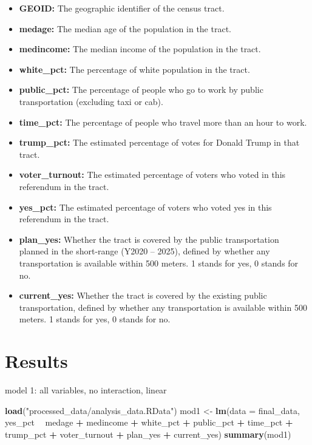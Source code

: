 \documentclass[
]{article}
\newenvironment{Shaded}{\begin{snugshade}}{\end{snugshade}}
\newcommand{\DataTypeTok}[1]{\textcolor[rgb]{0.13,0.29,0.53}{#1}}
\newcommand{\KeywordTok}[1]{\textcolor[rgb]{0.13,0.29,0.53}{\textbf{#1}}}
\newcommand{\NormalTok}[1]{#1}
\newcommand{\OperatorTok}[1]{\textcolor[rgb]{0.81,0.36,0.00}{\textbf{#1}}}
\newcommand{\StringTok}[1]{\textcolor[rgb]{0.31,0.60,0.02}{#1}}
\providecommand{\tightlist}{%
  \setlength{\itemsep}{0pt}\setlength{\parskip}{0pt}}
\begin{document}
\begin{itemize}
\tightlist
\item
  \textbf{GEOID:} The geographic identifier of the census tract.\\
\item
  \textbf{medage:} The median age of the population in the tract.
\item
  \textbf{medincome:} The median income of the population in the tract.
\item
  \textbf{white\_pct:} The percentage of white population in the tract.
\item
  \textbf{public\_pct:} The percentage of people who go to work by
  public transportation (excluding taxi or cab).\\
\item
  \textbf{time\_pct:} The percentage of people who travel more than an
  hour to work.\\
\item
  \textbf{trump\_pct:} The estimated percentage of votes for Donald
  Trump in that tract.
\item
  \textbf{voter\_turnout:} The estimated percentage of voters who voted
  in this referendum in the tract.
\item
  \textbf{yes\_pct:} The estimated percentage of voters who voted yes in
  this referendum in the tract.
\item
  \textbf{plan\_yes:} Whether the tract is covered by the public
  transportation planned in the short-range (Y2020 -- 2025), defined by
  whether any transportation is available within 500 meters. 1 stands
  for yes, 0 stands for no.\\
\item
  \textbf{current\_yes:} Whether the tract is covered by the existing
  public transportation, defined by whether any transportation is
  available within 500 meters. 1 stands for yes, 0 stands for no.
\end{itemize}

\hypertarget{results}{%
\section{Results}\label{results}}

model 1: all variables, no interaction, linear

\begin{Shaded}
\begin{Highlighting}[]
\KeywordTok{load}\NormalTok{(}\StringTok{"processed_data/analysis_data.RData"}\NormalTok{)}
\NormalTok{mod1 <-}\StringTok{ }\KeywordTok{lm}\NormalTok{(}\DataTypeTok{data =}\NormalTok{ final_data, yes_pct }\OperatorTok{~}\StringTok{ }\NormalTok{medage }\OperatorTok{+}\StringTok{ }\NormalTok{medincome }\OperatorTok{+}\StringTok{ }\NormalTok{white_pct }\OperatorTok{+}\StringTok{ }\NormalTok{public_pct }\OperatorTok{+}\StringTok{ }\NormalTok{time_pct }\OperatorTok{+}\StringTok{ }\NormalTok{trump_pct }\OperatorTok{+}\StringTok{ }\NormalTok{voter_turnout }\OperatorTok{+}\StringTok{ }\NormalTok{plan_yes }\OperatorTok{+}\StringTok{ }\NormalTok{current_yes)}
\KeywordTok{summary}\NormalTok{(mod1)}
\end{Highlighting}
\end{Shaded}
\end{document}
